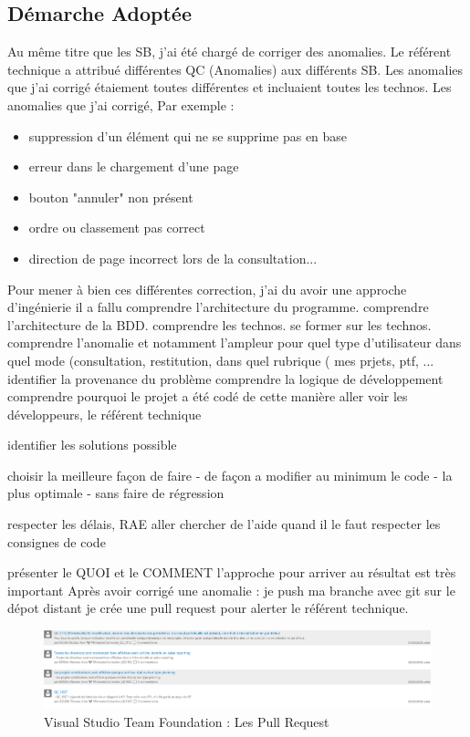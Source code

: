 \subsection{Démarche Adoptée}
Au même titre que les SB, j'ai été chargé de corriger des anomalies.
Le référent technique a attribué différentes QC (Anomalies) aux différents SB. 
Les anomalies que j'ai corrigé étaiement toutes différentes et incluaient toutes les technos.
Les anomalies que j'ai corrigé, Par exemple : 
\begin{itemize}
    \item suppression d'un élément qui ne se supprime pas en base
    \item erreur dans le chargement d'une page
    \item bouton "annuler" non présent
    \item ordre ou classement pas correct
    \item direction de page incorrect lors de la consultation...
\end{itemize}
Pour mener à bien ces différentes correction, j'ai du avoir une approche d'ingénierie
il a fallu comprendre l'architecture du programme.
comprendre l'architecture de la BDD.
comprendre les technos.
    se former sur les technos.
comprendre l'anomalie
    et notamment l'ampleur
    pour quel type d'utilisateur 
    dans quel mode (consultation, restitution, 
    dans quel rubrique ( mes prjets, ptf, ...
identifier la provenance du problème
comprendre la logique de développement
comprendre pourquoi le projet a été codé de cette manière
                aller voir les développeurs, 
                le référent technique
                
            identifier les solutions possible
            
            choisir la meilleure façon de faire
                - de façon a modifier au minimum le code
                - la plus optimale
                - sans faire de régression 
                
            respecter les délais, RAE
            aller chercher de l'aide quand il le faut
            respecter les consignes de code

présenter le QUOI et le COMMENT 
l'approche pour arriver au résultat est très important
Après avoir corrigé une anomalie : 
je push ma branche avec git sur le dépot distant
je crée une pull request pour alerter le référent technique.
\begin{figure}[!h]
\centering
\includegraphics[width=1\textwidth]{images/PullRequest.png}
\caption{Visual Studio Team Foundation : Les Pull Request}
\end{figure}
